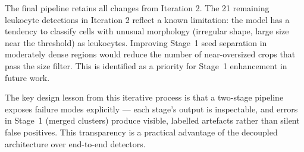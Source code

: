 \documentclass[10pt,twocolumn]{article}
\begin{document}
The final pipeline retains all changes from Iteration 2. The 21 remaining
leukocyte detections in Iteration 2 reflect a known limitation: the model
has a tendency to classify cells with unusual morphology (irregular shape,
large size near the threshold) as leukocytes. Improving Stage~1 seed
separation in moderately dense regions would reduce the number of
near-oversized crops that pass the size filter. This is identified as a
priority for Stage~1 enhancement in future work.

The key design lesson from this iterative process is that a two-stage
pipeline exposes failure modes explicitly --- each stage's output is
inspectable, and errors in Stage~1 (merged clusters) produce visible,
labelled artefacts rather than silent false positives. This transparency
is a practical advantage of the decoupled architecture over end-to-end
detectors.

\clearpage
\end{document}
